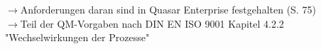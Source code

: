 



$\rightarrow$Anforderungen daran sind in Quasar Enterprise festgehalten (S. 75)\\
$\rightarrow$Teil der QM-Vorgaben nach DIN EN ISO 9001 Kapitel 4.2.2 "Wechselwirkungen der Prozesse" 


